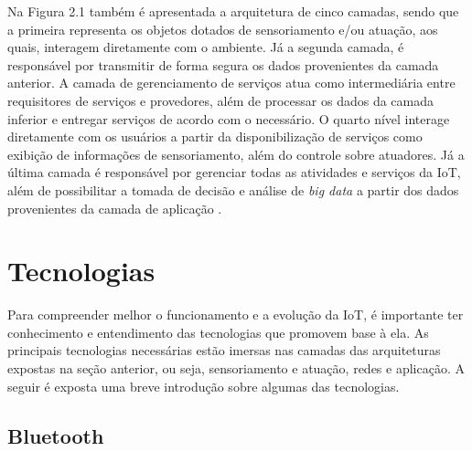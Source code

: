 
Na Figura 2.1 também é apresentada a arquitetura de cinco camadas, sendo que a primeira representa os objetos dotados de sensoriamento e/ou atuação, aos quais, interagem diretamente com o ambiente. Já a segunda camada, é responsável por transmitir de forma segura os dados provenientes da camada anterior. A camada de gerenciamento de serviços atua como intermediária entre requisitores de serviços e provedores, além de processar os dados da camada inferior e entregar  serviços de acordo com o necessário. O quarto nível interage diretamente com os usuários a partir da disponibilização de serviços como exibição de informações de sensoriamento, além do controle sobre atuadores. Já a última camada é responsável por gerenciar todas as atividades e serviços da IoT, além de possibilitar a tomada de decisão e análise de \textit{big data} a partir dos dados provenientes da camada de aplicação \cite{Al-Fuqaha2015}.



\section{Tecnologias}


Para compreender melhor o funcionamento e a evolução da IoT, é importante ter conhecimento e entendimento das tecnologias que promovem base à ela. As principais tecnologias necessárias estão imersas nas camadas das arquiteturas expostas na seção anterior, ou seja, sensoriamento e atuação, redes e aplicação. A seguir é exposta uma breve introdução sobre algumas das tecnologias.

\subsection{Bluetooth}

